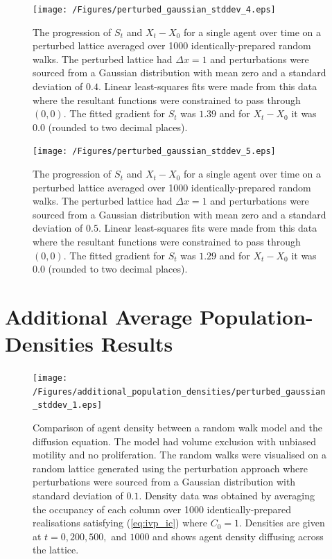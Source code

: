 \documentclass[11pt,titlepage,a4paper]{article}
\begin{document}
\begin{appendix}
		\begin{figure}[tbh]
			\centering
				\texttt{[image: /Figures/perturbed\_gaussian\_stddev\_4.eps]}
			\caption{The progression of $S_t$ and $X_t - X_0$ for a single agent over time on a perturbed lattice averaged over 1000 identically-prepared random walks. The perturbed lattice had $\Delta x = 1$ and perturbations were sourced from a Gaussian distribution with mean zero and a standard deviation of $0.4$. Linear least-squares fits were made from this data where the resultant functions were constrained to pass through $(0,0)$. The fitted gradient for $S_t$ was $1.39$ and for $X_t - X_0$ it was $0.0$ (rounded to two decimal places).}
			\label{fig:perturbed_gaussian_stddev_4}
		\end{figure}

		\begin{figure}[tbh]
			\centering
				\texttt{[image: /Figures/perturbed\_gaussian\_stddev\_5.eps]}
			\caption{The progression of $S_t$ and $X_t - X_0$ for a single agent over time on a perturbed lattice averaged over 1000 identically-prepared random walks. The perturbed lattice had $\Delta x = 1$ and perturbations were sourced from a Gaussian distribution with mean zero and a standard deviation of $0.5$. Linear least-squares fits were made from this data where the resultant functions were constrained to pass through $(0,0)$. The fitted gradient for $S_t$ was $1.29$ and for $X_t - X_0$ it was $0.0$ (rounded to two decimal places).}
			\label{fig:perturbed_gaussian_stddev_5}
		\end{figure}

	\pagebreak
	\section{Additional Average Population-Densities Results}
	\label{appendix:populationdensities}
	\setcounter{figure}{0}

		\begin{figure}[tbh]
			\centering
				\texttt{[image: /Figures/additional\_population\_densities/perturbed\_gaussian\_stddev\_1.eps]}
			\caption{Comparison of agent density between a random walk model and the diffusion equation. The model had volume exclusion with unbiased motility and no proliferation. The random walks were visualised on a random lattice generated using the perturbation approach where perturbations were sourced from a Gaussian distribution with standard deviation of $0.1$. Density data was obtained by averaging the occupancy of each column over 1000 identically-prepared realisations satisfying (\ref{eq:ivp_ic}) where $C_0 = 1$. Densities are given at $t = 0, 200, 500,$ and $1000$ and shows agent density diffusing across the lattice.}
			\label{fig:perturbed_gaussian_stddev_1}
		\end{figure}


\end{appendix}
\end{document}

